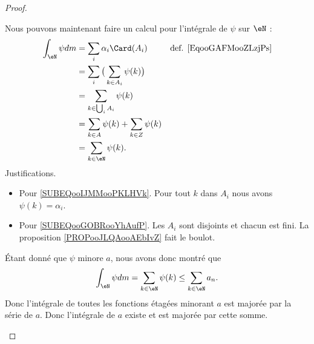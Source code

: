 \begin{proof}
\begin{subproof}
		Nous pouvons maintenant faire un calcul pour l'intégrale de \( \psi\) sur \( \eN\) :
		\begin{subequations}        \label{SUBEQSooPMCHooIdtHqG}
			\begin{align}
				\int_{\eN}\psi dm & =\sum_i\alpha_i\Card(A_i)                                                  & \text{def. \eqref{EqooGAFMooZLzjPs}} \\
				                  & =\sum_i\big( \sum_{k\in A_i}\psi(k)\big)       \label{SUBEQooIJMMooPKLHVk}                                        \\
				                  & =\sum_{k\in \bigcup_iA_i}\psi(k)           \label{SUBEQooGOBRooYhAufP}                                            \\
				                  & =\sum_{k\in A}\psi(k)+\sum_{k\in Z}\psi(k)                                                                        \\
				                  & =\sum_{k\in \eN}\psi(k).
			\end{align}
		\end{subequations}
		Justifications.
		\begin{itemize}
			\item Pour \eqref{SUBEQooIJMMooPKLHVk}. Pour tout \( k\) dans \( A_i\) nous avons \( \psi(k)=\alpha_i\).
			\item Pour \eqref{SUBEQooGOBRooYhAufP}. Les \( A_i\) sont disjoints et chacun est fini. La proposition \ref{PROPooJLQAooAEbIvZ} fait le boulot.
		\end{itemize}
		Étant donné que \( \psi\) minore \( a\), nous avons donc montré que
		\begin{equation}
			\int_{\eN}\psi dm=\sum_{k\in \eN}\psi(k)\leq\sum_{k\in \eN}a_n.
		\end{equation}
		Donc l'intégrale de toutes les fonctions étagées minorant \( a\) est majorée par la série de \( a\). Donc l'intégrale de \( a\) existe et est majorée par cette somme.


\end{subproof}
\end{proof}
